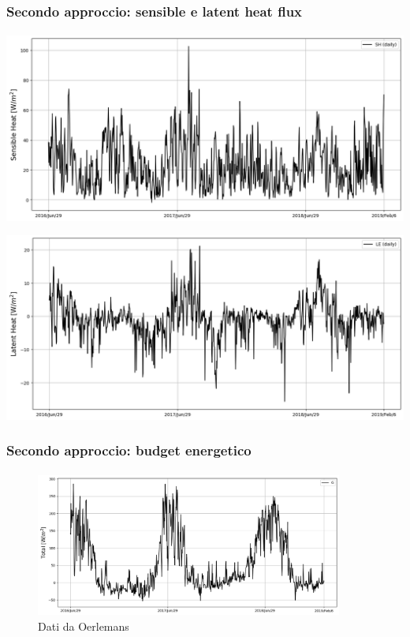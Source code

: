 \begin{frame}
    \frametitle{Secondo approccio: sensible e latent heat flux}
    \framesubtitle{}

    \center
    \begin{minipage}{0.5\textwidth}
        \includegraphics[width=\textwidth]{Immagini/sensibleAlt.png}
    \end{minipage}
    \begin{minipage}{0.5\textwidth}
        \includegraphics[width=\textwidth]{Immagini/latentAlt.png}
    \end{minipage}

\end{frame}


\begin{frame}
    \frametitle{Secondo approccio: budget energetico}
    \framesubtitle{}

    \begin{figure}
        \includegraphics[width=0.9\textwidth]{Immagini/totalAlt.png}
        \caption{Dati da Oerlemans}
    \end{figure}
  
\end{frame}


